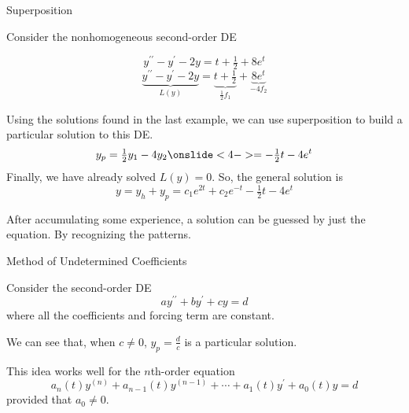 \documentclass{beamer}
\begin{document}
\begin{frame}{Superposition}
\begin{example}
Consider the nonhomogeneous second-order DE

\vspace{-4mm}
\begin{overprint}
\begin{equation*}
y^{\prime\prime}-y^{\prime}-2y=t+\tfrac{1}{2}+8e^t
\end{equation*}
\begin{equation*}
\underbrace{y^{\prime\prime}-y^{\prime}-2y}_{L(y)}=\underbrace{t+\tfrac{1}{2}}_{\tfrac{1}{2}f_1}+\underbrace{8e^t}_{-4f_2}
\end{equation*}
\end{overprint}
Using the solutions found in the last example, we can use superposition to build a particular solution to this DE\@.
\begin{equation*}
y_p=\tfrac{1}{2}y_1-4y_2
\onslide<4->
=-\tfrac{1}{2}t-4e^t
\end{equation*}
Finally, we have already solved $L(y)=0$. So, the general solution is
\begin{equation*}
y=y_h+y_p=c_1e^{2t}+c_2e^{-t}-\tfrac{1}{2}t-4e^t
\end{equation*}
\end{example}
\begin{block}{}
After accumulating some experience, a solution can be guessed by just  the equation. By recognizing the patterns.
\end{block}
\end{frame}

\begin{frame}{Method of Undetermined Coefficients}
\begin{example}
Consider the second-order DE 
\begin{equation*}
ay^{\prime\prime}+by^{\prime}+cy=d
\end{equation*}
where all the coefficients and forcing term are constant.\pause

We can see that, when $c\neq 0$, $y_p=\tfrac{d}{c}$ is a particular solution.
\end{example}\pause
\begin{block}{}
This idea works well for the $n$th-order equation
\begin{equation*}
a_n(t)y^{(n)}+a_{n-1}(t)y^{(n-1)}+\cdots+a_1(t)y^\prime+a_0(t)y=d
\end{equation*}
provided that $a_0\neq 0$.
\end{block}
\end{frame}
\end{document}
